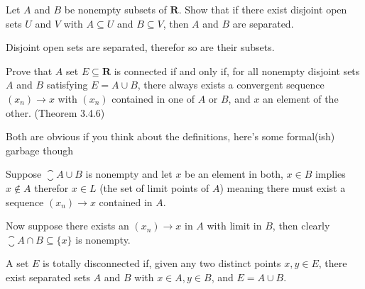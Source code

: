 \begin{solution}
  \enum{
  \item \TODO
  \item \TODO
  }
\end{solution}

\begin{exercise}
  Let $A$ and $B$ be nonempty subsets of $\mathbf{R}$. Show that if there exist disjoint open sets $U$ and $V$ with $A \subseteq U$ and $B \subseteq V$, then $A$ and $B$ are separated.
\end{exercise}

\begin{solution}
  Disjoint open sets are separated, therefor so are their subsets.
\end{solution}

\begin{exercise}
  Prove that $A$ set $E \subseteq \mathbf{R}$ is connected if and only if, for all nonempty disjoint sets $A$ and $B$ satisfying $E=A \cup B$, there always exists a convergent sequence $\left(x_{n}\right) \rightarrow x$ with $\left(x_{n}\right)$ contained in one of $A$ or $B$, and $x$ an element of the other. (Theorem 3.4.6)

\end{exercise}

\begin{solution}
  Both are obvious if you think about the definitions, here's some formal(ish) garbage though

  Suppose $\closure{A} \cup B$ is nonempty and let $x$ be an element in both, $x \in B$ implies $x \notin A$ therefor $x \in L$ (the set of limit points of $A$) meaning there must exist a sequence $(x_n) \to x$ contained in $A$.

  Now suppose there exists an $(x_n) \to x$ in $A$ with limit in $B$, then clearly $\closure{A} \cap B \subseteq \{x\}$ is nonempty.
\end{solution}

\begin{exercise}
  A set $E$ is totally disconnected if, given any two distinct points $x, y \in E$, there exist separated sets $A$ and $B$ with $x \in A, y \in B$, and $E=A \cup B$.
\end{exercise}

\begin{solution}
\end{solution}

